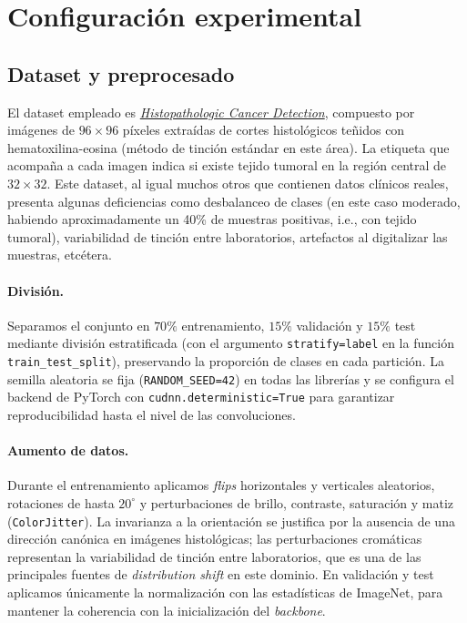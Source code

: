 \documentclass{article}
\begin{document}
\section{Configuraci\'on experimental}
\label{sec:setup}
 
\subsection{Dataset y preprocesado}
\label{sec:dataset}

El dataset empleado es \href{https://www.kaggle.com/c/histopathologic-cancer-detection}{\emph{Histopathologic Cancer Detection}}, 
compuesto por imágenes de $96\times 96$ píxeles extraídas de cortes histológicos teñidos con hematoxilina-eosina (método de tinción estándar en este área).
La etiqueta que acompaña a cada imagen indica si existe tejido tumoral en la región central de $32\times 32$. 
Este dataset, al igual muchos otros que contienen datos clínicos reales, presenta algunas deficiencias como
desbalanceo de clases (en este caso moderado, habiendo aproximadamente un 40\% de muestras positivas, i.e., con tejido tumoral),
variabilidad de tinción entre laboratorios, artefactos al digitalizar las muestras, etcétera.

\paragraph{Divisi\'on.}
Separamos el conjunto en $70\%$ entrenamiento, $15\%$ validaci\'on y
$15\%$ test mediante divisi\'on estratificada
(con el argumento \texttt{stratify=label} en la función \texttt{train\_test\_split}), preservando la
proporci\'on de clases en cada partici\'on.
La semilla aleatoria se fija (\texttt{RANDOM\_SEED=42}) en
todas las librer\'ias y se configura el backend de PyTorch con
\texttt{cudnn.deterministic=True} para
garantizar reproducibilidad hasta el nivel de las convoluciones.


\paragraph{Aumento de datos.}
Durante el entrenamiento aplicamos \textit{flips} horizontales y verticales
aleatorios, rotaciones de hasta $20^{\circ}$ y perturbaciones de
brillo, contraste, saturaci\'on y matiz (\texttt{ColorJitter}). %
La invarianza a la orientaci\'on se justifica por la ausencia de una
direcci\'on can\'onica en im\'agenes histol\'ogicas; 
las perturbaciones
crom\'aticas representan la variabilidad de tinci\'on entre laboratorios,
que es una de las principales fuentes de \emph{distribution shift} en
este dominio.
En validaci\'on y test aplicamos \'unicamente la normalizaci\'on con
las estad\'isticas de ImageNet, 
para mantener la coherencia con la inicializaci\'on del \emph{backbone}.
\end{document}
